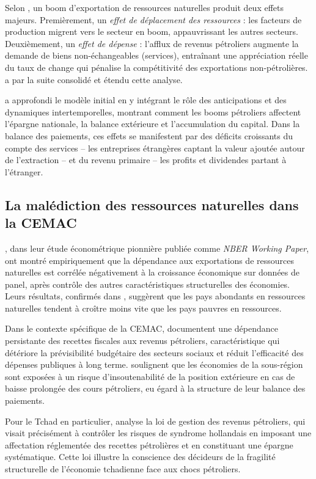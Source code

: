 \documentclass[12pt,a4paper]{article}
\begin{document}
Selon \textcite{cordenneary1982}, un boom d'exportation de ressources naturelles produit deux
effets majeurs. Premièrement, un \textit{effet de déplacement des ressources} : les facteurs
de production migrent vers le secteur en boom, appauvrissant les autres secteurs. Deuxièmement,
un \textit{effet de dépense} : l'afflux de revenus pétroliers augmente la demande de biens
non-échangeables (services), entraînant une appréciation réelle du taux de change qui pénalise
la compétitivité des exportations non-pétrolières. \textcite{corden1984} a par la suite
consolidé et étendu cette analyse.

\textcite{wijnbergen1984} a approfondi le modèle initial en y intégrant le rôle des
anticipations et des dynamiques intertemporelles, montrant comment les booms pétroliers
affectent l'épargne nationale, la balance extérieure et l'accumulation du capital. Dans la
balance des paiements, ces effets se manifestent par des déficits croissants du compte des
services -- les entreprises étrangères captant la valeur ajoutée autour de l'extraction --
et du revenu primaire -- les profits et dividendes partant à l'étranger.

\subsection{La malédiction des ressources naturelles dans la CEMAC}

\textcite{sachswarner1995}, dans leur étude économétrique pionnière publiée comme
\textit{NBER Working Paper}, ont montré empiriquement que la dépendance aux exportations
de ressources naturelles est corrélée négativement à la croissance économique sur données
de panel, après contrôle des autres caractéristiques structurelles des économies. Leurs
résultats, confirmés dans \textcite{sachswarner2001}, suggèrent que les pays abondants en
ressources naturelles tendent à croître moins vite que les pays pauvres en ressources.

Dans le contexte spécifique de la CEMAC, \textcite{beac2023} documentent une dépendance
persistante des recettes fiscales aux revenus pétroliers, caractéristique qui détériore la
prévisibilité budgétaire des secteurs sociaux et réduit l'efficacité des dépenses publiques
à long terme. \textcite{imfcemac2021} soulignent que les économies de la sous-région sont
exposées à un risque d'insoutenabilité de la position extérieure en cas de baisse prolongée
des cours pétroliers, eu égard à la structure de leur balance des paiements.

Pour le Tchad en particulier, \textcite{peggetchad2005} analyse la loi de gestion des
revenus pétroliers, qui visait précisément à contrôler les risques de syndrome hollandais
en imposant une affectation réglementée des recettes pétrolières et en constituant une
épargne systématique. Cette loi illustre la conscience des décideurs de la fragilité
structurelle de l'économie tchadienne face aux chocs pétroliers.
\end{document}
